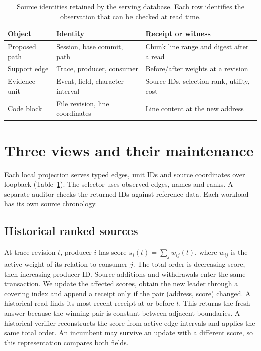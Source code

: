 \documentclass[conference]{IEEEtran}
\begin{document}
\begin{table}[t]
\centering\small
\caption{Source identities retained by the serving database. Each row identifies the observation that can be checked at read time.}
\begin{tabular}{@{}p{}p{}p{}@{}}\toprule
Object & Identity & Receipt or witness\\\midrule
Proposed path & Session, base commit, path & Chunk line range and digest after a read\\
Support edge & Trace, producer, consumer & Before/after weights at a revision\\
Evidence unit & Event, field, character interval & Source IDs, selection rank, utility, cost\\
Code block & File revision, line coordinates & Line content at the new address\\\bottomrule
\end{tabular}
\label{tab:objects}
\end{table}

\section{Three views and their maintenance}
Each local projection serves typed edges, unit IDs and source coordinates over loopback (Table~\ref{tab:objects}). The selector uses observed edges, names and ranks. A separate auditor checks the returned IDs against reference data. Each workload has its own source chronology.

\subsection{Historical ranked sources}
At trace revision $t$, producer $i$ has score $s_i(t)=\sum_j w_{ij}(t)$, where $w_{ij}$ is the active weight of its relation to consumer $j$. The total order is decreasing score, then increasing producer ID. Source additions and withdrawals enter the same transaction. We update the affected scores, obtain the new leader through a covering index and append a receipt only if the pair (address, score) changed. A historical read finds its most recent receipt at or before $t$. This returns the fresh answer because the winning pair is constant between adjacent boundaries. A historical verifier reconstructs the score from active edge intervals and applies the same total order. An incumbent may survive an update with a different score, so this representation compares both fields.
\end{document}
